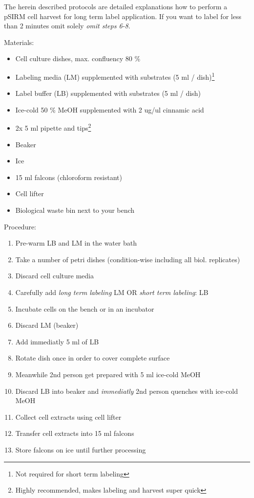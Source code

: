 \documentclass[]{book}
\providecommand{\tightlist}{%
  \setlength{\itemsep}{0pt}\setlength{\parskip}{0pt}}
\let\rmarkdownfootnote\footnote%
\def\footnote{\protect\rmarkdownfootnote}
\theoremstyle{definition}
\theoremstyle{definition}
\theoremstyle{definition}
\theoremstyle{remark}
\begin{document}
The herein described protocols are detailed explanations how to perform
a pSIRM cell harvest for long term label application. If you want to
label for less than 2 minutes omit solely \emph{omit steps 6-8}.

Materials:

\begin{itemize}
\tightlist
\item
  Cell culture dishes, max. confluency 80 \%
\item
  Labeling media (LM) supplemented with substrates (5 ml /
  dish)\footnote{Not required for short term labeling}
\item
  Label buffer (LB) supplemented with substrates (5 ml / dish)
\item
  Ice-cold 50 \% MeOH supplemented with 2 ug/ul cinnamic acid
\item
  2x 5 ml pipette and tips\footnote{Highly recommended, makes labeling
    and harvest super quick}
\item
  Beaker
\item
  Ice
\item
  15 ml falcons (chloroform resistant)
\item
  Cell lifter
\item
  Biological waste bin next to your bench
\end{itemize}

Procedure:

\begin{enumerate}
\def\labelenumi{\arabic{enumi}.}
\tightlist
\item
  Pre-warm LB and LM in the water bath
\item
  Take a number of petri dishes (condition-wise including all biol.
  replicates)
\item
  Discard cell culture media
\item
  Carefully add \emph{long term labeling} LM OR \emph{short term
  labeling}: LB
\item
  Incubate cells on the bench or in an incubator
\item
  Discard LM (beaker)
\item
  Add immediatly 5 ml of LB
\item
  Rotate dish once in order to cover complete surface
\item
  Meanwhile 2nd person get prepared with 5 ml ice-cold MeOH
\item
  Discard LB into beaker and \emph{immediatly} 2nd person quenches with
  ice-cold MeOH
\item
  Collect cell extracts using cell lifter
\item
  Transfer cell extracts into 15 ml falcons
\item
  Store falcons on ice until further processing
\end{enumerate}
\end{document}
